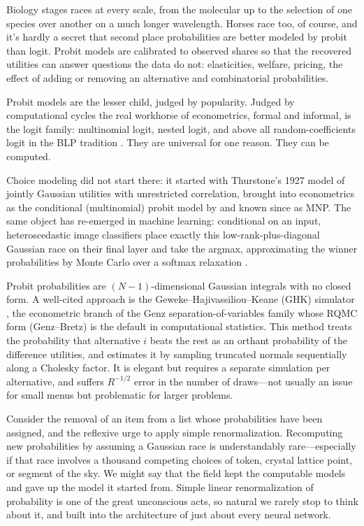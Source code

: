 \documentclass[12pt]{article}
\theoremstyle{remark}
\begin{document}
Biology stages races at every scale, from the molecular up to the selection of one species over another on a much longer wavelength.
Horses race too, of course, and it's hardly a secret that second place probabilities are better modeled by probit than logit.  Probit models are calibrated to observed shares so that the recovered
utilities can answer questions the data do not: elasticities, welfare,
pricing, the effect of adding or removing an alternative and combinatorial probabilities. 

Probit models are the lesser child, judged by popularity.  Judged by computational cycles the real workhorse of econometrics, formal and informal, is the logit family: multinomial logit,
nested logit, and above all random-coefficients logit in the BLP tradition
\citep{berry1995,train2009,conlon2020}. They are universal for one reason.
They can be computed.

Choice modeling did not start there: it started with Thurstone's 1927 model
\citep{thurstone1927} of jointly Gaussian utilities with unrestricted
correlation, brought into econometrics as the conditional (multinomial)
probit model by \citet{hausman1978} and known since as MNP. The same
object has re-emerged in machine learning: conditional on an input,
heteroscedastic image classifiers place exactly this
low-rank-plus-diagonal Gaussian race on their final layer and take the
argmax, approximating the winner probabilities by Monte Carlo over a
softmax relaxation \citep{collier2021}.

Probit probabilities are $(N-1)$-dimensional Gaussian integrals with no
closed form. A well-cited approach is the Geweke--Hajivassiliou--Keane
(GHK) simulator \citep{geweke1994,hajivassiliou1998,train2009}, the
econometric branch of the Genz separation-of-variables family
\citep{genz1992} whose RQMC form (Genz--Bretz) is the default in
computational statistics.  This method treats
the probability that alternative $i$ beats the rest as an orthant
probability of the difference utilities, and estimates it by sampling
truncated normals sequentially along a Cholesky factor. It is elegant but requires a separate simulation per alternative, and suffers $R^{-1/2}$ error in
the number of draws---not usually an issue for small menus but problematic for larger problems. 

Consider the removal of an item from a list whose probabilities have been assigned, and the reflexive urge to apply simple renormalization. Recomputing new
probabilities by assuming a Gaussian race is understandably rare---especially if that race involves a thousand competing choices of token, crystal lattice point, or
segment of the sky. We might say that the field kept the computable models and gave up the model it started
from. Simple linear renormalization of probability is one of the great unconscious acts, so natural we rarely stop to think about it, and built into 
the architecture of just about every neural network. 
\end{document}
